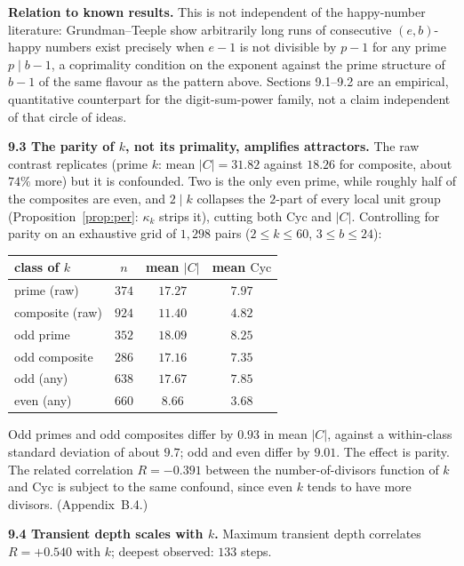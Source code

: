\documentclass[11pt]{article}
\theoremstyle{definition}
\theoremstyle{remark}
\newcommand{\Cyc}{\mathrm{Cyc}}
\begin{document}
\textbf{Relation to known results.} This is not independent of the happy-number literature: Grundman--Teeple \cite{GT07} show arbitrarily long runs of consecutive $(e,b)$-happy numbers exist precisely when $e-1$ is not divisible by $p-1$ for any prime $p \mid b-1$, a coprimality condition on the exponent against the prime structure of $b-1$ of the same flavour as the pattern above. Sections 9.1--9.2 are an empirical, quantitative counterpart for the digit-sum-power family, not a claim independent of that circle of ideas.

\medskip
\noindent\textbf{9.3 The parity of $k$, not its primality, amplifies attractors.} The raw contrast replicates (prime $k$: mean $|C| = 31.82$ against $18.26$ for composite, about $74\%$ more) but it is confounded. Two is the only even prime, while roughly half of the composites are even, and $2 \mid k$ collapses the $2$-part of every local unit group (Proposition~\ref{prop:per}: $\kappa_k$ strips it), cutting both $\Cyc$ and $|C|$. Controlling for parity on an exhaustive grid of $1{,}298$ pairs ($2 \le k \le 60$, $3 \le b \le 24$):

\begin{center}
\begin{tabular}{@{}lccc@{}}
\toprule
class of $k$ & $n$ & mean $|C|$ & mean $\Cyc$ \\
\midrule
prime (raw) & $374$ & $17.27$ & $7.97$ \\
composite (raw) & $924$ & $11.40$ & $4.82$ \\
odd prime & $352$ & $18.09$ & $8.25$ \\
odd composite & $286$ & $17.16$ & $7.35$ \\
odd (any) & $638$ & $17.67$ & $7.85$ \\
even (any) & $660$ & $8.66$ & $3.68$ \\
\bottomrule
\end{tabular}
\end{center}

Odd primes and odd composites differ by $0.93$ in mean $|C|$, against a within-class standard deviation of about $9.7$; odd and even differ by $9.01$. The effect is parity. The related correlation $R = -0.391$ between the number-of-divisors function of $k$ and $\Cyc$ is subject to the same confound, since even $k$ tends to have more divisors. (Appendix~B.4.)

\medskip
\noindent\textbf{9.4 Transient depth scales with $k$.} Maximum transient depth correlates $R = +0.540$ with $k$; deepest observed: $133$ steps.
\end{document}
